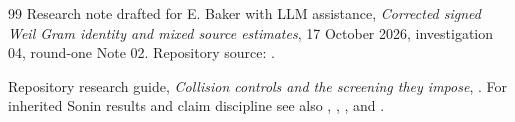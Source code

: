 \documentclass[11pt]{article}
\theoremstyle{remark}
\numberwithin{equation}{section}
\begin{document}
\begin{thebibliography}{99}
Research note drafted for E. Baker with LLM assistance,
\emph{Corrected signed Weil Gram identity and mixed source estimates},
17 October 2026, investigation 04, round-one Note 02.
Repository source:
.

Repository research guide,
\emph{Collision controls and the screening they impose},
.
For inherited Sonin results and claim discipline see also
,
,
,
and .

\end{thebibliography}
\end{document}
